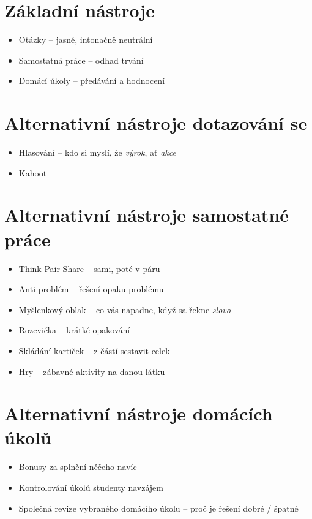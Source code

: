 \documentclass[twoside,openany,10pt]{book}
\begin{document}
\section*{Základní nástroje}
\begin{itemize}
\item Otázky -- jasné, intonačně neutrální
\item Samostatná práce -- odhad trvání
\item Domácí úkoly -- předávání a hodnocení
\end{itemize}

\section*{Alternativní nástroje dotazování se}
\begin{itemize}
\item Hlasování -- kdo si myslí, že \textit{výrok}, ať \textit{akce}
\item Kahoot
\end{itemize}

\section*{Alternativní nástroje samostatné práce}
\begin{itemize}
\item Think-Pair-Share -- sami, poté v páru
\item Anti-problém -- řešení opaku problému
\item Myšlenkový oblak -- co vás napadne, když sa řekne \textit{slovo}
\item Rozcvička -- krátké opakování
\item Skládání kartiček -- z částí sestavit celek
\item Hry -- zábavné aktivity na danou látku
\end{itemize}

\section*{Alternativní nástroje domácích úkolů}
\begin{itemize}
\item Bonusy za splnění něčeho navíc
\item Kontrolování úkolů studenty navzájem
\item Společná revize vybraného domácího úkolu -- proč je řešení dobré / špatné
\end{itemize}
\end{document}
